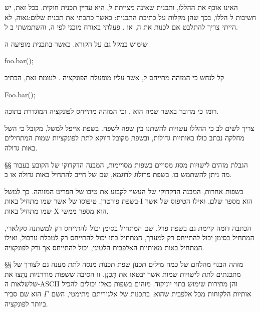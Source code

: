 ה אינו אוכף את ה הללו, ותכנית שאינה מצייתת
ל, היא עדיין תכנית חוקית. בכל זאת, יש חשיבות ל
הללו, בכך שהן מקלות על כתיבת התכנית: כאשר כתבתי את
 תכנית שלום:גאוה, לא הייתי צריך להתלבט אם לכנות את
ה , או . פעלתי באורח מוכני
לפי ה, והשתמשתי ב ל.

שימוש ב מקל גם על הקורא. כאשר בתכנית  מופיעה
ה
\begin{קוד}
\begin{Pascal}
foo.bar();
\end{Pascal}
\end{קוד}


קל לנחש כי המזהה  מתייחס ל, אשר עליו מופעלת הפונקציה
. לעומת זאת, הכתיב

\begin{קוד}
\begin{Pascal}
Foo.bar();
\end{Pascal}
\end{קוד}

רומז כי מדובר ב אשר שמה הוא , וכי המזהה 
מתייחס לפונקציה  המוגדרת בתוכה.

צריך לשים לב כי ה הללו עשויות להשתנו בין שפה לשפה.
בשפת אייפל למשל, מקובל כי ה של מחלקה נכתב כולו באותיות
גדולות, ובשפת  מקובל דווקא לתת לפונקציות שמות המתחילים באות גדולה.

§§ הגבלת מזהים לישויות מסוג מסויים
בשפות מסויימות, המבנה הדקדוקי של ה קובע בעבור מה ניתן להשתמש בו. בשפת
פרולוג לדוגמא, שם של  חייב להתחיל באות גדולה או ב.

בשפות אחרות, המבנה הדקדוקי של ה עשוי לקבוע את טיבו של הפריט המזוהה. כך
למשל בשפת פורטרן, טיפוסו של  אשר שמו מתחיל באות-I הוא מספר שלם, ואילו
הטיפוס של  אשר שמו מתחיל באות-X הוא מספר ממשי.

הכתבה דומה קיימת גם בשפת פרל, שם  המתחיל בסימן  יכול להתייחס רק
למשתנה סקלארי,  המתחיל בסימן  יכול להתייחס רק למערך,  המתחיל
בתו  יכול להתייחס רק לטבלת ערבול, ואילו  המתחיל באות מאותיות
האלפבית הלטיני, יכול להתייחס אך ורק לפונקציה.

§§ מזהה הבנוי מהלחם של כמה מילים
תכנון שפת תכנות מנסה לתת מענה גם לצורך של מתכנתים לתת לישויות שמות אשר יבטאו
את תָּכְנָן. זו הסיבה ששפות מודרניות נִתְּצוּ את שלשלאות ה-ASCII והן מתירות שימוש
בתוי יוניקוד. מזהים בשפות כאלו יכולים להכיל אותיות הלקוחות מכל אלפבית שהוא.
בתכנות של אלגוריתם מתימטי, השם~$Γ$ הוא שם סביר ביותר לפונקציה.

